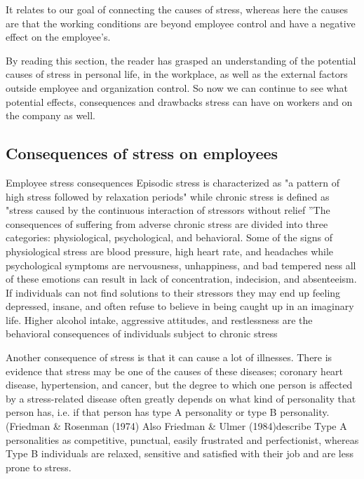 It relates to our goal of connecting the causes of stress, whereas here the causes are that the working conditions are beyond employee control and have a negative effect on the employee's\cite[p.~10]{Fairbrother2003WorkplaceSatisfaction}.

By reading this section, the reader has grasped an understanding of the potential causes of stress in personal life, in the workplace, as well as the external factors outside employee and organization control.  So now we can continue to see what potential effects, consequences and drawbacks stress can have on workers and on the company as well.

\subsection{Consequences of stress on employees}
Employee stress consequences Episodic stress is characterized as "a pattern of high stress followed by relaxation periods" while chronic stress is defined as "stress caused by the continuous interaction of stressors without relief \citep[p.313]{Bloisi2007ManagementBehaviour}”The consequences of suffering from adverse chronic stress are divided into three categories: physiological, psychological, and behavioral. Some of the signs of physiological stress are blood pressure, high heart rate, and headaches while psychological symptoms are nervousness, unhappiness, and bad tempered ness all of these emotions can result in lack of concentration, indecision, and absenteeism. If individuals can not find solutions to their stressors they may end up feeling depressed, insane, and often refuse to believe in being caught up in an imaginary life. Higher alcohol intake, aggressive attitudes, and restlessness are the behavioral consequences of individuals subject to chronic stress \citep[p.323]{Bloisi2007ManagementBehaviour}

Another consequence of stress is that it can cause a lot of illnesses.  There is evidence that stress may be one of the causes of these diseases; coronary heart disease, hypertension, and cancer, but the degree to which one person is affected by a stress-related disease often greatly depends on what kind of personality that person has, i.e. if that person has type A personality or type B personality.  (Friedman  \&  Rosenman  (1974)  Also  Friedman  \&  Ulmer (1984)describe Type A personalities as competitive, punctual, easily frustrated and perfectionist, whereas Type B individuals are relaxed, sensitive and satisfied with their job and are less prone to stress.

